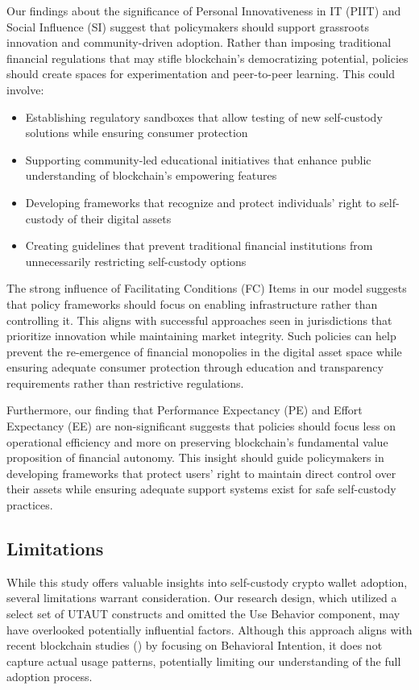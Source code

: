 \documentclass[twocolumn]{article}
\begin{document}
Our findings about the significance of Personal Innovativeness in IT (PIIT) and Social Influence (SI) suggest that policymakers should support grassroots innovation and community-driven adoption. Rather than imposing traditional financial regulations that may stifle blockchain's democratizing potential, policies should create spaces for experimentation and peer-to-peer learning. This could involve:
\begin{itemize}
   \item Establishing regulatory sandboxes that allow testing of new self-custody solutions while ensuring consumer protection
   \item Supporting community-led educational initiatives that enhance public understanding of blockchain's empowering features
   \item Developing frameworks that recognize and protect individuals' right to self-custody of their digital assets
   \item Creating guidelines that prevent traditional financial institutions from unnecessarily restricting self-custody options
\end{itemize}

The strong influence of Facilitating Conditions (FC) Items in our model suggests that policy frameworks should focus on enabling infrastructure rather than controlling it. This aligns with successful approaches seen in jurisdictions that prioritize innovation while maintaining market integrity. Such policies can help prevent the re-emergence of financial monopolies in the digital asset space while ensuring adequate consumer protection through education and transparency requirements rather than restrictive regulations.

Furthermore, our finding that Performance Expectancy (PE) and Effort Expectancy (EE) are non-significant suggests that policies should focus less on operational efficiency and more on preserving blockchain's fundamental value proposition of financial autonomy. This insight should guide policymakers in developing frameworks that protect users' right to maintain direct control over their assets while ensuring adequate support systems exist for safe self-custody practices.


\subsection{Limitations}

While this study offers valuable insights into self-custody crypto wallet adoption, several limitations warrant consideration. Our research design, which utilized a select set of UTAUT constructs and omitted the Use Behavior component, may have overlooked potentially influential factors. Although this approach aligns with recent blockchain studies (\cite{chang_acceptance_2022,queiroz_blockchain_2019}) by focusing on Behavioral Intention, it does not capture actual usage patterns, potentially limiting our understanding of the full adoption process.
\end{document}
